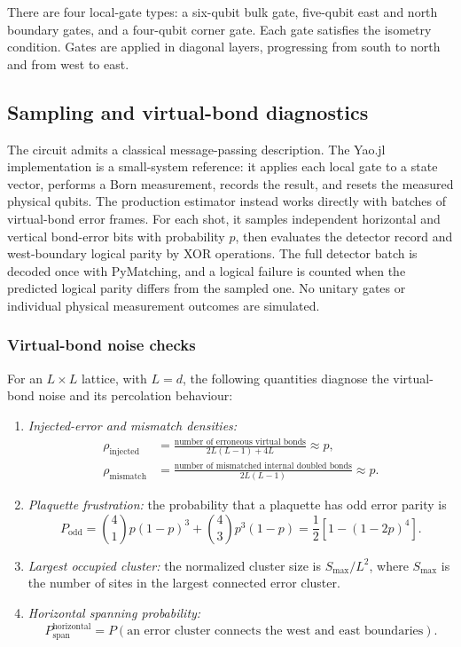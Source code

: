 \documentclass[11pt]{article}
\theoremstyle{definition}
\begin{document}
There are four local-gate types: a six-qubit bulk gate, five-qubit east and
north boundary gates, and a four-qubit corner gate. Each gate satisfies the
isometry condition. Gates are applied in diagonal layers, progressing from
south to north and from west to east.

\subsection{Sampling and virtual-bond diagnostics}

The circuit admits a classical message-passing description. The Yao.jl
implementation is a small-system reference: it applies each local gate to a
state vector, performs a Born measurement, records the result, and resets the
measured physical qubits. The production estimator instead works directly
with batches of virtual-bond error frames. For each shot, it samples
independent horizontal and vertical bond-error bits with probability \(p\),
then evaluates the detector record and west-boundary logical parity by XOR
operations. The full detector batch is decoded once with PyMatching, and a
logical failure is counted when the predicted logical parity differs from the
sampled one. No unitary gates or individual physical measurement outcomes are
simulated.



\subsubsection{Virtual-bond noise checks}

For an \(L\times L\) lattice, with \(L=d\), the following quantities diagnose
the virtual-bond noise and its percolation behaviour:
\begin{enumerate}
  \item \textit{Injected-error and mismatch densities:}
  \begin{align*}
  \rho_{\mathrm{injected}}
  &=\frac{\text{number of erroneous virtual bonds}}{2L(L-1)+4L}\approx p, \\
  \rho_{\mathrm{mismatch}}
  &=\frac{\text{number of mismatched internal doubled bonds}}{2L(L-1)}\approx p.
  \end{align*}

  \item \textit{Plaquette frustration:} the probability that a plaquette has
  odd error parity is
  \[
  P_{\mathrm{odd}}
  =\binom{4}{1}p(1-p)^3+\binom{4}{3}p^3(1-p)
  =\frac{1}{2}\left[1-(1-2p)^4\right].
  \]

  \item \textit{Largest occupied cluster:} the normalized cluster size is
  \(S_{\max}/L^2\), where \(S_{\max}\) is the number of sites in the largest
  connected error cluster.

  \item \textit{Horizontal spanning probability:}
  \[
  P_{\mathrm{span}}^{\mathrm{horizontal}}
  =P(\text{an error cluster connects the west and east boundaries}).
  \]
\end{enumerate}
\end{document}
